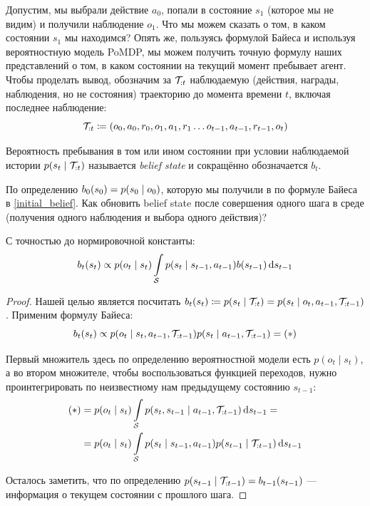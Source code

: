 Допустим, мы выбрали действие $a_0$, попали в состояние $s_1$ (которое мы не видим) и получили наблюдение $o_1$. Что мы можем сказать о том, в каком состоянии $s_1$ мы находимся? Опять же, пользуясь формулой Байеса и используя вероятностную модель PoMDP, мы можем получить точную формулу наших представлений о том, в каком состоянии на текущий момент пребывает агент. Чтобы проделать вывод, обозначим за $\mathcal{T}_{:t}$ наблюдаемую (действия, награды, наблюдения, но не состояния) траекторию до момента времени $t$, включая последнее наблюдение:
$$\mathcal{T}_{:t} \coloneqq (o_0, a_0, r_0, o_1, a_1, r_1 \dots o_{t - 1}, a_{t - 1}, r_{t - 1}, o_t)$$

\begin{definition}
Вероятность пребывания в том или ином состоянии при условии наблюдаемой истории $p(s_t \HM\mid \Traj_{:t})$ называется \emph{belief state} и сокращённо обозначается $b_t$.
\end{definition}

По определению $b_0(s_0) \HM= p(s_0 \HM\mid o_0)$, которую мы получили в по формуле Байеса в \eqref{initial_belief}. Как обновить belief state после совершения одного шага в среде (получения одного наблюдения и выбора одного действия)?

\begin{theorem}
С точностью до нормировочной константы:
\begin{equation}\label{beliefupdate}
b_t(s_t) \propto p(o_{t} \mid s_{t})\int\limits_{\mathcal{S}} p(s_t \mid s_{t - 1}, a_{t - 1})b(s_{t - 1}) \mathop{}\!\mathrm{d} s_{t - 1}
\end{equation}
\begin{proof}
Нашей целью является посчитать $b_t(s_t) \HM\coloneqq p(s_t \HM\mid \Traj_{:t}) \HM= p(s_t \HM\mid o_t, a_{t-1}, \Traj_{:{t-1}})$. Применим формулу Байеса:
$$b_t(s_t) \propto p(o_t \mid s_t, a_{t-1}, \mathcal{T}_{:{t-1}})p(s_t \mid a_{t-1}, \mathcal{T}_{:{t-1}}) = (*)$$

Первый множитель здесь по определению вероятностной модели есть $p(o_t \mid s_t)$, а во втором множителе, чтобы воспользоваться функцией переходов, нужно проинтегрировать по неизвестному нам предыдущему состоянию $s_{t - 1}$:
\begin{align*}
(*) 
&= p(o_t \mid s_t) \int\limits_{\mathcal{S}} p(s_t, s_{t - 1} \mid a_{t - 1}, \mathcal{T}_{:{t-1}}) \mathop{}\!\mathrm{d} s_{t - 1} = \\ 
&= p(o_t \mid s_t) \int\limits_{\mathcal{S}} p(s_t \mid s_{t - 1}, a_{t - 1})p(s_{t - 1} \mid \mathcal{T}_{:{t-1}}) \mathop{}\!\mathrm{d} s_{t - 1}
\end{align*}

Осталось заметить, что по определению $p(s_{t - 1} \mid \mathcal{T}_{:{t-1}}) = b_{t - 1}(s_{t - 1})$ --- информация о текущем состоянии с прошлого шага.
\end{proof}
\end{theorem}


